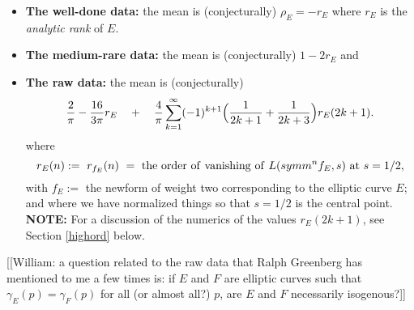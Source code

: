 \documentclass[11pt]{article}
\theoremstyle{plain}
\theoremstyle{definition}
\newtheorem{project}[theorem]{Project}
\numberwithin{equation}{section}
\numberwithin{figure}{section}
\numberwithin{table}{section}
\begin{document}
    \begin{itemize}
   \item {\bf The well-done data:} the  mean is (conjecturally) $\rho_E= -r_E$ where $r_E$ is the {\it analytic rank} of $E$.
    \item {\bf The medium-rare data:} the  mean is  (conjecturally)  $1-2r_E$ and
      \item {\bf The raw data:} the  mean is  (conjecturally) \begin{equation*}
{\frac{2}{\pi}}- {\frac{16}{3\pi}}r_E \ \ \ + \ \ \  {\frac{4}{\pi}} \sum_{k=1}^{\infty}  (-1)^{k+1}\Bigl({\frac{1}{2k+1}} + {\frac{1}{2k+3}}\Bigr) r_E({2k+1}).
\end{equation*} where $$r_E(n):= \ r_{f_E}(n)\ = \ {\rm the\ order\ of\ vanishing\ of\ }L(symm^nf_E, s)\ {\rm at}\ s=1/2,$$ with $f_E:=$ the newform of weight two corresponding to the elliptic curve $E$; and where we have normalized things so that $s=1/2$ is the central point. {\bf NOTE:} For a discussion of the numerics of the values $r_E({2k+1})$, see Section {\ref{highord}} below.
   \end{itemize}

[[William: a question related to the raw data that Ralph Greenberg has mentioned to me a few times is: if $E$ and $F$ are elliptic curves such that $\gamma_E(p)=\gamma_F(p)$ for all (or almost all?) $p$, are $E$ and $F$ necessarily isogenous?]]   


\end{document}
